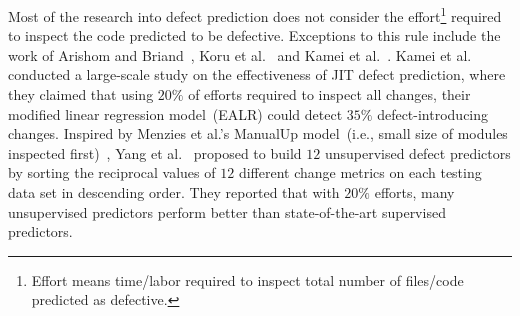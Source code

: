 \documentclass[sigconf]{acmart}
\theoremstyle{break}
\begin{document}
 Most of the research into defect prediction   does not consider the effort\footnote{Effort means time/labor required to inspect total number
of files/code predicted as defective.} required to inspect the code predicted to be defective. Exceptions to this
 rule include the work of Arishom and Briand~\cite{Arisholm:2006},
 Koru et al.~\cite{koru2009investigation} and Kamei et al.~\cite{kamei2013large}.
 Kamei et al.~\cite{kamei2013large} conducted a large-scale study on the effectiveness of JIT defect prediction, where they claimed that using $
20\%$ of efforts required to inspect all changes, their modified linear regression model~(EALR) could
detect $35\%$ defect-introducing changes. Inspired by Menzies et al.'s ManualUp model~(i.e., small size of modules inspected first)~\cite{menzies2010defect}, Yang et al.~\cite{yang2016effort} proposed to build $12$ unsupervised defect predictors by sorting the reciprocal values of $12$ different change metrics on each testing data set in descending order. They
reported that with $20\%$ efforts, many
unsupervised predictors perform better than state-of-the-art supervised predictors.



\end{document}
